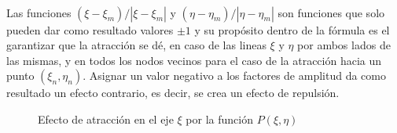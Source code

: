 \documentclass[letterpaper, openright, 12pt]{book}
\begin{document}
		\paragraph*{}
			Las funciones $(\xi - \xi_{m}) / |\xi - \xi_{m}|$ y $(\eta - \eta_{m}) / |\eta - \eta_{m}|$ son funciones que solo pueden dar como resultado valores $\pm 1$ y su propósito dentro de la fórmula es el garantizar que la atracción se dé, en caso de las lineas $\xi$ y $\eta$ por ambos lados de las mismas, y en todos los nodos vecinos para el caso de la atracción hacia un punto $(\xi_{n}, \eta_{n})$. Asignar un valor negativo a los factores de amplitud da como resultado un efecto contrario, es decir, se crea un efecto de repulsión.
			\begin{figure}[htbp!]
				\centering
				\hspace{1cm}
				\caption[Efecto de atracción por función $P(\xi,\eta)$]{Efecto de atracción en el eje $\xi$ por la función $P(\xi, \eta)$}
				\label{fig:densidad-xi}
			\end{figure}
			
\end{document}
